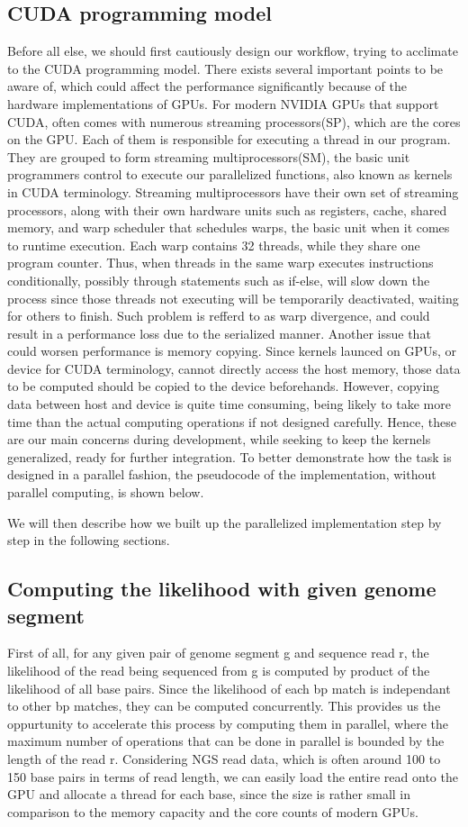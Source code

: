 \documentclass{PHlab-thesis}
\begin{document}
\subsection{CUDA programming model}
Before all else, we should first cautiously design our workflow, trying to acclimate to the CUDA programming model. There exists several important points to be aware of, which could affect the performance significantly because of the hardware implementations of GPUs. For modern NVIDIA GPUs that support CUDA, often comes with numerous streaming processors(SP), which are the cores on the GPU. Each of them is responsible for executing a thread in our program. They are grouped to form streaming multiprocessors(SM), the basic unit programmers control to execute our parallelized functions, also known as kernels in CUDA terminology. Streaming multiprocessors have their own set of streaming processors, along with their own hardware units such as registers, cache, shared memory, and warp scheduler that schedules warps, the basic unit when it comes to runtime execution. Each warp contains 32 threads, while they share one program counter. Thus, when threads in the same warp executes instructions conditionally, possibly through statements such as if-else, will slow down the process since those threads not executing will be temporarily deactivated, waiting for others to finish. Such problem is refferd to as warp divergence, and could result in a performance loss due to the serialized manner. Another issue that could worsen performance is memory copying. Since kernels launced on GPUs, or device for CUDA terminology, cannot directly access the host memory, those data to be computed should be copied to the device beforehands. However, copying data between host and device is quite time consuming, being likely to take more time than the actual computing operations if not designed carefully. Hence, these are our main concerns during development, while seeking to keep the kernels generalized, ready for further integration. To better demonstrate how the task is designed in a parallel fashion, the pseudocode of the implementation, without parallel computing, is shown below.

We will then describe how we built up the parallelized implementation step by step in the following sections.

\subsection{Computing the likelihood with given genome segment}
First of all, for any given pair of genome segment g and sequence read r, the likelihood of the read being sequenced from g is computed by product of the likelihood of all base pairs. Since the likelihood of each bp match is independant to other bp matches, they can be computed concurrently. This provides us the oppurtunity to accelerate this process by computing them in parallel, where the maximum number of operations that can be done in parallel is bounded by the length of the read r. Considering NGS read data, which is often around 100 to 150 base pairs in terms of read length, we can easily load the entire read onto the GPU and allocate a thread for each base, since the size is rather small in comparison to the memory capacity and the core counts of modern GPUs.
\end{document}
